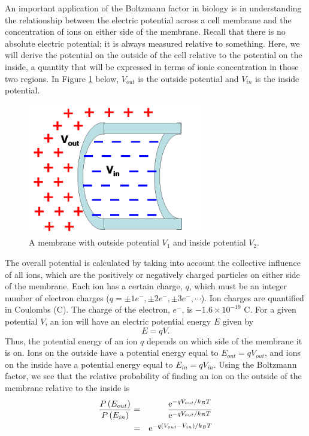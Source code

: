 An important application of the Boltzmann factor in biology is in understanding the relationship between the electric potential across a cell membrane and the concentration of ions on either side of the membrane.  Recall that there is no absolute electric potential; it is always measured relative to something.  Here, we will derive the potential on the outside of the cell relative to the potential on the inside, a quantity that will be expressed in terms of ionic concentration in those two regions.  In Figure \ref{Fig8-2} below, $V_{out}$ is the outside potential and $V_{in}$ is the inside potential.    
\begin{figure}[htb]
	\centering
	\includegraphics[width=3.0in]{./figures/Topic8/Fig8-2.png}
	\caption{A membrane with outside potential $V_1$ and inside potential $V_2$.}
 	\label{Fig8-2}
\end{figure}
The overall potential is calculated by taking into account the collective influence of all ions, which are the positively or negatively charged particles on either side of the membrane.  Each ion has a certain charge, $q$, which must be an integer number of electron charges ($q = \pm 1e^-, \pm 2e^-, \pm 3e^-, \cdots$).  Ion charges are quantified in Coulombs (C).  The charge of the electron, $e^-$, is $-1.6\times10^{-19}$ C.    
For a given potential $V$, an ion will have an electric potential energy $E$ given by
\begin{equation}
\label{eqn8-3}
E=qV.
\end{equation}
Thus, the potential energy of an ion $q$ depends on which side of the membrane it is on.  Ions on the outside have a potential energy equal to $E_{out} = qV_{out}$, and ions on the inside have a potential energy equal to $E_{in} = qV_{in}$.  Using the Boltzmann factor, we see that the relative probability of finding an ion on the outside of the membrane relative to the inside is
\begin{eqnarray}\label{eqn8-4}
\frac{P\left(E_{out}\right)}{P\left(E_{in}\right)}&=&\frac{{\rm e}^{-qV_{out}/k_BT}}{{\rm e}^{-qV_{out}/k_BT}}\nonumber\\
&=&{\rm e}^{-q\left(V_{out}-V_{in}\right)/k_BT}
\end{eqnarray}
